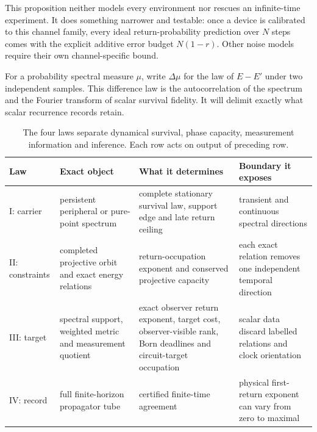 This proposition neither models every environment nor rescues an
infinite-time experiment.  It does something narrower and testable: once a
device is calibrated to this channel family, every ideal return-probability
prediction over $N$ steps comes with the explicit additive error budget
$N(1-r)$.  Other noise models require their own channel-specific bound.

For a probability spectral measure $\mu$, write $\Delta\mu$ for the law of
$E-E'$ under two independent samples.  This difference law is the
autocorrelation of the spectrum and the Fourier transform of scalar survival
fidelity.  It will delimit exactly what scalar recurrence records retain.

\begin{table}[H]
\centering
\small
\begin{tabularx}{\textwidth}{@{}
  >{\raggedright\arraybackslash}p{}
  >{\raggedright\arraybackslash}p{}
  >{\raggedright\arraybackslash}X
  >{\raggedright\arraybackslash}X@{}}
\toprule
Law & Exact object & What it determines & Boundary it exposes \\
\midrule
I: carrier & persistent peripheral or pure-point spectrum & complete
  stationary survival law, support edge and late return ceiling & transient
  and continuous spectral directions \\
II: constraints & completed projective orbit and exact energy relations &
  return-occupation exponent and conserved projective capacity & each exact
  relation removes one independent temporal direction \\
III: target & spectral support, weighted metric and measurement quotient &
  exact observer return exponent, target cost, observer-visible rank, Born deadlines and
  circuit-target occupation &
  scalar data discard labelled relations and clock orientation \\
IV: record & full finite-horizon propagator tube & certified finite-time
  agreement & physical first-return exponent can vary from zero to maximal \\
\bottomrule
\end{tabularx}
\caption{The four laws separate dynamical survival, phase capacity,
measurement information and inference.  Each row acts on output of preceding
row.}
\label{tab:hierarchy}
\end{table}

